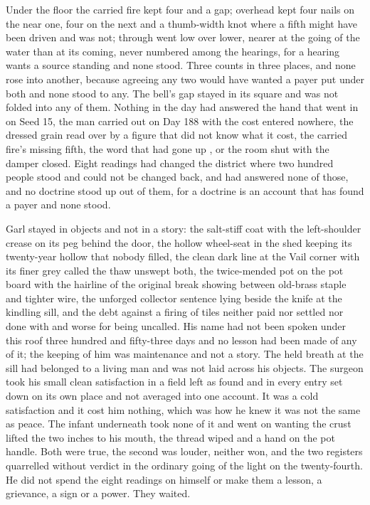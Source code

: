 Under the floor the carried fire kept four and a gap; overhead  kept four nails on the near one, four on the next and a thumb-width knot where a fifth might have been driven and was not; through   went low over lower, nearer at the going of the water than at its coming, never numbered among the hearings, for a hearing wants a source standing and none stood. Three counts in three places, and none rose into another, because agreeing any two would have wanted a payer put under both and none stood to any. The bell’s gap stayed in its square and was not folded into any of them. Nothing in the day had answered the hand that went in on Seed 15, the man carried out on Day 188 with the cost entered nowhere, the dressed grain read over by a figure that did not know what it cost, the carried fire’s missing fifth, the word that had gone up , or the room shut with the damper closed. Eight readings had changed the district where two hundred people stood and could not be changed back, and had answered none of those, and no doctrine stood up out of them, for a doctrine is an account that has found a payer and none stood.

Garl stayed in objects and not in a story: the salt-stiff coat with the left-shoulder crease on its peg behind the door, the hollow wheel-seat in the shed keeping its twenty-year hollow that nobody filled, the clean dark line at the Vail corner with its finer grey called the thaw unswept both, the twice-mended pot on the pot board with the hairline of the original break showing between old-brass staple and tighter wire, the unforged collector sentence lying beside the knife at the kindling sill, and the debt against a firing of tiles neither paid nor settled nor done with and worse for being uncalled. His name had not been spoken under this roof three hundred and fifty-three days and no lesson had been made of any of it; the keeping of him was maintenance and not a story. The held breath at the sill had belonged to a living man and was not laid across his objects. The surgeon took his small clean satisfaction in a field left as found and in every entry set down on its own place and not averaged into one account. It was a cold satisfaction and it cost him nothing, which was how he knew it was not the same as peace. The infant underneath took none of it and went on wanting the crust lifted the two inches to his mouth, the thread wiped and a hand on the pot handle. Both were true, the second was louder, neither won, and the two registers quarrelled without verdict in the ordinary going of the light on the twenty-fourth. He did not spend the eight readings on himself or make them a lesson, a grievance, a sign or a power. They waited.

